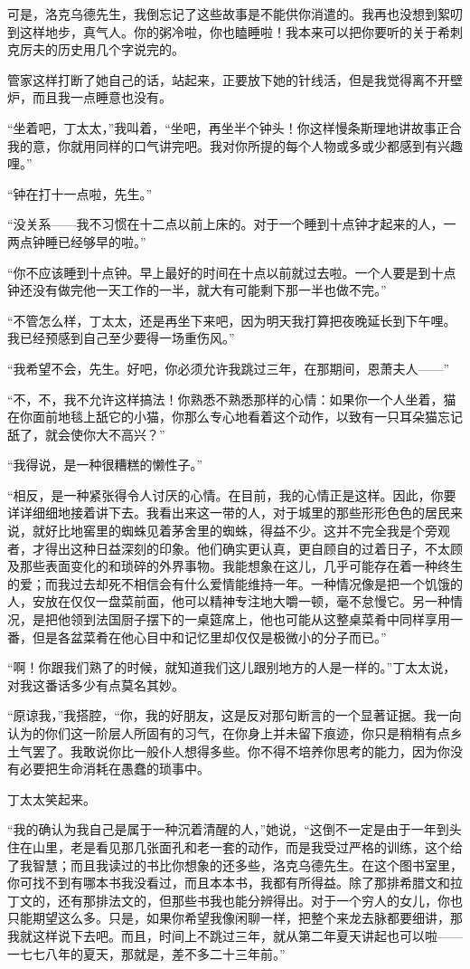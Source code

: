\par 可是，洛克乌德先生，我倒忘记了这些故事是不能供你消遣的。我再也没想到絮叨到这样地步，真气人。你的粥冷啦，你也瞌睡啦！我本来可以把你要听的关于希刺克厉夫的历史用几个字说完的。
\par 管家这样打断了她自己的话，站起来，正要放下她的针线活，但是我觉得离不开壁炉，而且我一点睡意也没有。
\par “坐着吧，丁太太，”我叫着，“坐吧，再坐半个钟头！你这样慢条斯理地讲故事正合我的意，你就用同样的口气讲完吧。我对你所提的每个人物或多或少都感到有兴趣哩。”
\par “钟在打十一点啦，先生。”
\par “没关系——我不习惯在十二点以前上床的。对于一个睡到十点钟才起来的人，一两点钟睡已经够早的啦。”
\par “你不应该睡到十点钟。早上最好的时间在十点以前就过去啦。一个人要是到十点钟还没有做完他一天工作的一半，就大有可能剩下那一半也做不完。”
\par “不管怎么样，丁太太，还是再坐下来吧，因为明天我打算把夜晚延长到下午哩。我已经预感到自己至少要得一场重伤风。”
\par “我希望不会，先生。好吧，你必须允许我跳过三年，在那期间，恩萧夫人——”
\par “不，不，我不允许这样搞法！你熟悉不熟悉那样的心情：如果你一个人坐着，猫在你面前地毯上舐它的小猫，你那么专心地看着这个动作，以致有一只耳朵猫忘记舐了，就会使你大不高兴？”
\par “我得说，是一种很糟糕的懒性子。”
\par “相反，是一种紧张得令人讨厌的心情。在目前，我的心情正是这样。因此，你要详详细细地接着讲下去。我看出来这一带的人，对于城里的那些形形色色的居民来说，就好比地窖里的蜘蛛见着茅舍里的蜘蛛，得益不少。这并不完全我是个旁观者，才得出这种日益深刻的印象。他们确实更认真，更自顾自的过着日子，不太顾及那些表面变化的和琐碎的外界事物。我能想象在这儿，几乎可能存在着一种终生的爱；而我过去却死不相信会有什么爱情能维持一年。一种情况像是把一个饥饿的人，安放在仅仅一盘菜前面，他可以精神专注地大嚼一顿，毫不怠慢它。另一种情况，是把他领到法国厨子摆下的一桌筵席上，他也可能从这整桌菜肴中同样享用一番，但是各盆菜肴在他心目中和记忆里却仅仅是极微小的分子而已。”
\par “啊！你跟我们熟了的时候，就知道我们这儿跟别地方的人是一样的。”丁太太说，对我这番话多少有点莫名其妙。
\par “原谅我，”我搭腔，“你，我的好朋友，这是反对那句断言的一个显著证据。我一向认为的你们这一阶层人所固有的习气，在你身上并未留下痕迹，你只是稍稍有点乡土气罢了。我敢说你比一般仆人想得多些。你不得不培养你思考的能力，因为你没有必要把生命消耗在愚蠢的琐事中。
\par 丁太太笑起来。
\par “我的确认为我自己是属于一种沉着清醒的人，”她说，“这倒不一定是由于一年到头住在山里，老是看见那几张面孔和老一套的动作，而是我受过严格的训练，这个给了我智慧；而且我读过的书比你想象的还多些，洛克乌德先生。在这个图书室里，你可找不到有哪本书我没看过，而且本本书，我都有所得益。除了那排希腊文和拉丁文的，还有那排法文的，但那些书我也能分辨得出。对于一个穷人的女儿，你也只能期望这么多。只是，如果你希望我像闲聊一样，把整个来龙去脉都要细讲，那我就这样说下去吧。而且，时间上不跳过三年，就从第二年夏天讲起也可以啦——一七七八年的夏天，那就是，差不多二十三年前。”


